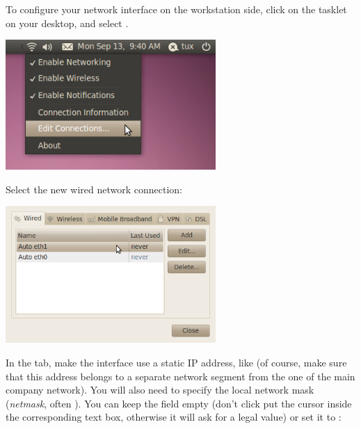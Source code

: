 To configure your network interface on the workstation side, click on
the  tasklet on your desktop, and select
.

\begin{center}
\includegraphics[width=8cm]{labs/kernel-board-setup/network-config-1.png}
\end{center}

Select the new wired network connection:

\begin{center}
\includegraphics[width=8cm]{labs/kernel-board-setup/network-config-2.png}
\end{center}

In the  tab, make the interface use a static IP
address, like  (of course, make sure that this address
belongs to a separate network segment from the one of the main company
network). You will also need to specify the local network mask
(\emph{netmask}, often ). You can keep the
 field empty (don't click put the cursor inside the
corresponding text box, otherwise it will ask for a legal value)
or set it to :

